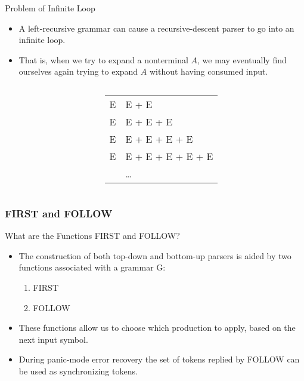 \begin{bibunit}[apalike]
\begin{frame}{Problem of Infinite Loop}
	\begin{itemize}
	\item A left-recursive grammar can cause a recursive-descent parser to go into an infinite loop.
	\item That is, when we try to expand a nonterminal $A$, we may eventually find ourselves again trying to expand $A$ without having consumed input.
	\end{itemize}
	\vfill
	\begin{columns}
		\begin{column}{.5\linewidth}
			\begin{bnf}
			\end{bnf}
		\end{column}
		\begin{column}{.5\linewidth}\bnfstyle
			\begin{tabular}{@{}ll@{}}
				E & \deriv E \tok+ E \\
				E & \deriv E \tok+ E \tok+ E \\
				E & \deriv E \tok+ E \tok+ E \tok+ E \\
				E & \deriv E \tok+ E \tok+ E \tok+ E \tok+ E \\
				& \deriv \dots
			\end{tabular}
		\end{column}
	\end{columns}	
\end{frame}

\subsubsection{FIRST and FOLLOW}

\tableofcontentslide[sectionstyle={show/shaded},subsectionstyle={show/shaded/hide},subsubsectionstyle={show/shaded/hide/hide}]

\begin{frame}{What are the Functions FIRST and FOLLOW?}
	\begin{itemize}
	\item The construction of both top-down and bottom-up parsers is aided by two functions associated with a grammar G:
		\begin{enumerate}
		\item FIRST
		\item FOLLOW
		\end{enumerate}
	\vfill
	\item These functions allow us to choose which production to apply, based on the next input symbol.
	\vfill
	\item During panic-mode error recovery the set of tokens replied by FOLLOW can be used as synchronizing tokens.
	\end{itemize}
\end{frame}


\end{bibunit}
